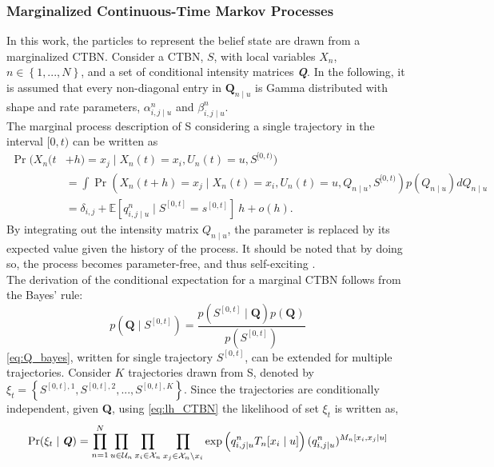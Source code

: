 \subsubsection{Marginalized Continuous-Time Markov Processes}
\label{sec:marg_ctbn}
In this work, the particles to represent the belief state are drawn from a marginalized CTBN. Consider a CTBN, $ S $, with local variables $ X_n $, $ n\in \left\lbrace 1,...,N \right\rbrace $, and a set of conditional intensity matrices \textbf{\textit{Q}}. In the following, it is assumed that every non-diagonal entry in $ \textbf{Q}_{n\mid u} $ is Gamma distributed with shape and rate parameters, $ \alpha^n_{i,j\mid u} $ and $ \beta^n_{i,j\mid u} $.\\
The marginal process description of S considering a single trajectory in the interval $ [0,t) $ can be written as
\begin{align}
\operatorname{Pr}(X_n(t &+ h) = x_j \mid X_n(t)=x_i, U_n(t)=u, S^{[0, t)})\\
&= \int \operatorname{Pr}(X_n(t + h) = x_j \mid X_n(t)=x_i, U_n(t)=u, Q_{n\mid u}, S^{[0, t)})p(Q_{n\mid u})dQ_{n\mid u}\\
&= \delta_{i,j} + \mathbb{E}[q^n_{i,j\mid u} \mid S^{[0, t]} = s^{[0, t]}]\ h + o(h).
\label{eq:marginal_CTBN}
\end{align}
By integrating out the intensity matrix $ Q_{n\mid u} $, the parameter is replaced by its expected value given the history of the process. It should be noted that by doing so, the process becomes parameter-free, and thus self-exciting \cite{Studer2016}. \\
The derivation of the conditional expectation for a marginal CTBN follows from the Bayes' rule:
\begin{equation}
p\left(\textbf{Q} \mid S^{[0,t]}\right)=\frac{p\left(S^{[0,t]} \mid \textbf{Q}\right) p(\textbf{Q})}{p\left(S^{[0,t]}\right)}
\label{eq:Q_bayes}
\end{equation}
\autoref{eq:Q_bayes}, written for single trajectory $ S^{[0,t]} $, can be extended for multiple trajectories. Consider $ K $ trajectories drawn from S, denoted by $ \xi_t = \left\lbrace S^{[0,t], 1}, S^{[0,t], 2}, ..., S^{[0,t], K} \right\rbrace  $. Since the trajectories are conditionally independent, given \textbf{Q}, using \autoref{eq:lh_CTBN} the likelihood of set $ \xi_t $ is written as,
\begin{align}
\operatorname{Pr}( \xi_t  \mid \textbf{\textit{Q}} ) = \prod_{n=1}^{N} \prod_{u \in \mathcal{U}_{n}} \prod_{x_i \in \mathcal{X}_{n}} \prod_{x_j \in \mathcal{X}_{n} \backslash x_i}
\exp \left( q_{i,j\mid u}^{n} T_{n}[x_i\mid u]\right) (q_{i,j\mid u}^{n})^{M_{n}[x_i, x_j\mid u]}
\label{eq:lh_dataset_CTBN}
\end{align}
